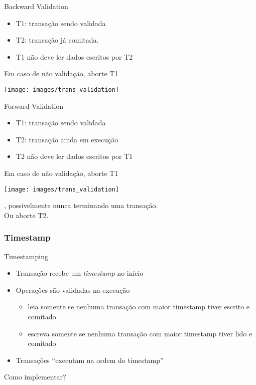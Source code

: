 \begin{frame}{Backward Validation}
\begin{itemize}
	\item T1: transação sendo validada
	\item T2: transação já comitada.
	\item T1 não deve ler dados escritos por T2
\end{itemize}
Em caso de não validação, aborte T1

\texttt{[image: images/trans\_validation]}
\end{frame}

\begin{frame}{Forward Validation}
\begin{itemize}
	\item T1: transação sendo validada
	\item T2: transação ainda em execução
	\item T2 não deve ler dados escritos por T1
\end{itemize}
Em caso de não validação, aborte T1

\texttt{[image: images/trans\_validation]}

\pause, possivelmente nunca terminando uma transação.\\
Ou aborte T2.
\end{frame}

\subsubsection{Timestamp}
\begin{frame}{Timestamping}
\begin{itemize}
	\item Transação recebe um \emph{timestamp} no início
	\item Operações são validadas na execução
	\begin{itemize}
		\item leia somente se nenhuma transação com maior timestamp tiver escrito e comitado
		\item escreva somente se nenhuma transação com maior timestamp tiver lido e comitado
	\end{itemize}
	\item Transações ``executam na ordem do timestamp''
\end{itemize}

Como implementar?
\end{frame}

